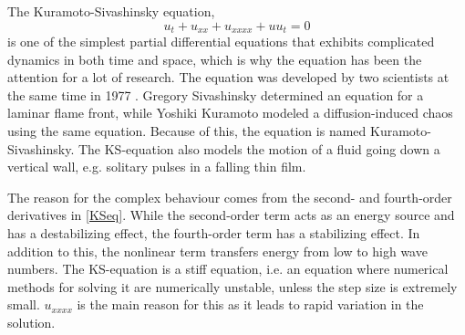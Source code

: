 The Kuramoto-Sivashinsky equation,
\begin{equation}
\label{KSeq}
u_t + u_{xx} + u_{xxxx} + uu_{t} = 0 
\end{equation}
is one of the simplest partial differential equations that exhibits complicated dynamics in both time and space, which is why the equation has been the attention for a lot of research. The equation was developed by two scientists at the same time in 1977 \cite{development}. Gregory Sivashinsky determined an equation for a laminar flame front, while Yoshiki Kuramoto modeled a diffusion-induced chaos using the same equation. Because of this, the equation is named Kuramoto-Sivashinsky. The KS-equation also models the motion of a fluid going down a vertical wall, e.g. solitary pulses in a falling thin film. \cite{trivia}

The reason for the complex behaviour comes from the second- and fourth-order derivatives in \eqref{KSeq}. While the second-order term acts as an energy source and has a destabilizing effect, the fourth-order term has a stabilizing effect. In addition to this, the nonlinear term transfers energy from low to high wave numbers. \cite{stabil} The KS-equation is a stiff equation, i.e. an equation where numerical methods for solving it are numerically unstable, unless the step size is extremely small. $u_{xxxx}$ is the main reason for this as it leads to rapid variation in the solution.







